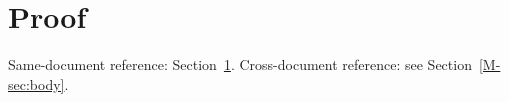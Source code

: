 \documentclass{article}
\begin{document}
\section{Proof}\label{app:proof}
Same-document reference: Section~\ref{app:proof}.
Cross-document reference: see Section~\ref{M-sec:body}.
\end{document}
